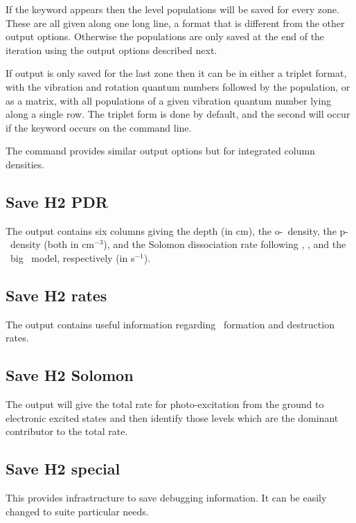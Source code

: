 If the keyword  appears then the level populations 
will be saved for every zone.   These are all given along one long line,
a format that is different from the other output options.  Otherwise the
populations are only saved at the end of the iteration using the output
options described next.

If output is only saved for the last zone then it can be in either
a triplet format, with the vibration and rotation quantum numbers followed
by the population, or as a matrix, with all populations of a given vibration
quantum number lying along a single row.  The triplet form is done by
default, and the second will occur if the keyword
 occurs on the command line.

The  command provides similar output
options but for integrated column densities.

\subsection{Save H2 PDR}

The output contains six columns giving the depth (in cm), the
o-\htwo\ density, the p-\htwo\ density (both in cm$^{-3}$), and the Solomon
dissociation rate following \citet{Tielens1985a}, \citet{Bertoldi1996}, and
the \Cloudy\ big \htwo\ model, respectively (in s$^{-1}$).

\subsection{Save H2 rates}

The output contains useful information regarding \htwo\ formation and
destruction rates.

\subsection{Save H2 Solomon}

The output will give the total rate for photo-excitation from the ground
to electronic excited states and then identify those levels which are the
dominant contributor to the total rate.

\subsection{Save H2 special}

This provides infrastructure to save debugging information.  It can
be easily changed to suite particular needs.


